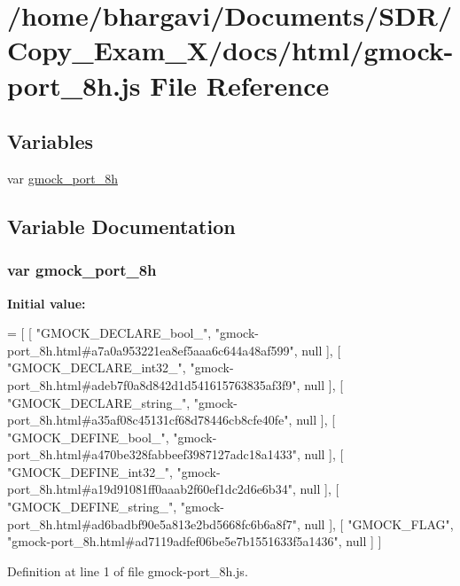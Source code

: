 \hypertarget{gmock-port__8h_8js}{}\section{/home/bhargavi/\+Documents/\+S\+D\+R/\+Copy\+\_\+\+Exam\+\_\+X/docs/html/gmock-\/port\+\_\+8h.js File Reference}
\label{gmock-port__8h_8js}
\subsection*{Variables}
\begin{DoxyCompactItemize}
\item 
var \hyperlink{gmock-port__8h_8js_aca5c89d1a438cbe4869ea81e17da3337}{gmock\+\_\+port\+\_\+8h}
\end{DoxyCompactItemize}


\subsection{Variable Documentation}
\subsubsection[{\texorpdfstring{gmock\+\_\+port\+\_\+8h}{gmock_port_8h}}]{\setlength{\rightskip}{0pt plus 5cm}var gmock\+\_\+port\+\_\+8h}\hypertarget{gmock-port__8h_8js_aca5c89d1a438cbe4869ea81e17da3337}{}\label{gmock-port__8h_8js_aca5c89d1a438cbe4869ea81e17da3337}
{\bfseries Initial value\+:}
\begin{DoxyCode}
=
[
    [ \textcolor{stringliteral}{"GMOCK\_DECLARE\_bool\_"}, \textcolor{stringliteral}{"gmock-port\_8h.html#a7a0a953221ea8ef5aaa6c644a48af599"}, null ],
    [ \textcolor{stringliteral}{"GMOCK\_DECLARE\_int32\_"}, \textcolor{stringliteral}{"gmock-port\_8h.html#adeb7f0a8d842d1d541615763835af3f9"}, null ],
    [ \textcolor{stringliteral}{"GMOCK\_DECLARE\_string\_"}, \textcolor{stringliteral}{"gmock-port\_8h.html#a35af08c45131cf68d78446cb8cfe40fe"}, null ],
    [ \textcolor{stringliteral}{"GMOCK\_DEFINE\_bool\_"}, \textcolor{stringliteral}{"gmock-port\_8h.html#a470be328fabbeef3987127adc18a1433"}, null ],
    [ \textcolor{stringliteral}{"GMOCK\_DEFINE\_int32\_"}, \textcolor{stringliteral}{"gmock-port\_8h.html#a19d91081ff0aaab2f60ef1dc2d6e6b34"}, null ],
    [ \textcolor{stringliteral}{"GMOCK\_DEFINE\_string\_"}, \textcolor{stringliteral}{"gmock-port\_8h.html#ad6badbf90e5a813e2bd5668fc6b6a8f7"}, null ],
    [ \textcolor{stringliteral}{"GMOCK\_FLAG"}, \textcolor{stringliteral}{"gmock-port\_8h.html#ad7119adfef06be5e7b1551633f5a1436"}, null ]
]
\end{DoxyCode}


Definition at line 1 of file gmock-\/port\+\_\+8h.\+js.

